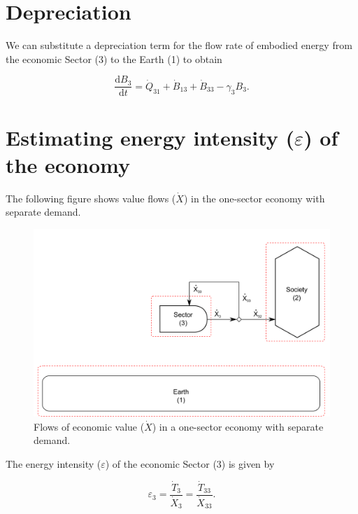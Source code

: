\section{Depreciation}

We can substitute a depreciation term for the flow rate of embodied energy from the economic Sector (3) to the Earth (1) to obtain

\begin{equation} \label{eq:ExB_embodied_energy_accounting_with_depreciation}
	\frac{\mathrm{d}B_3}{\mathrm{d}t} = \dot{Q}_{31} + \dot{B}_{13} + \dot{B}_{33} - \gamma_3 B_3.
\end{equation}

\section{Estimating energy intensity ($\varepsilon$) of the economy}

The following figure shows value flows ($\dot{X}$) in the one-sector economy with separate demand.

\begin{figure}[H]
\includegraphics[width=1.0\linewidth]{Chapter_Example_B/images/I-O_two_sector_value.pdf}
\caption{Flows of economic value ($\dot{X}$) in a one-sector economy with separate demand.}
\label{fig:economic_value_flows}
\end{figure}

The energy intensity ($\varepsilon$) of the economic Sector (3) is given by

\begin{equation} \label{eq:single_sector_energy_intensity}
	\varepsilon_{3} = \frac{\dot{T}_{3}}{\dot{X}_{3}} = \frac{\dot{T}_{33}}{\dot{X}_{33}}.
\end{equation}

